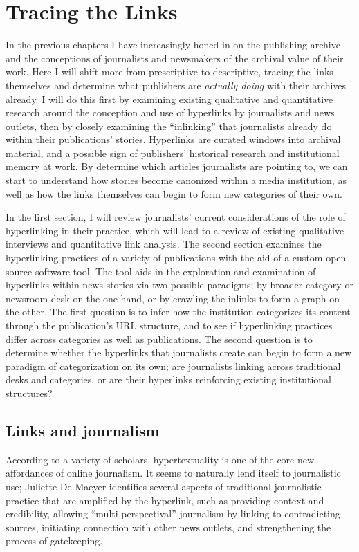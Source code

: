 \chapter{Tracing the Links}

In the previous chapters I have increasingly honed in on the publishing archive and the conceptions of journalists and newsmakers of the archival value of their work. Here I will shift more from prescriptive to descriptive, tracing the links themselves and determine what publishers are \emph{actually doing} with their archives already. I will do this first by examining existing qualitative and quantitative research around the conception and use of hyperlinks by journalists and news outlets, then by closely examining the ``inlinking'' that journalists already do within their publications' stories. Hyperlinks are curated windows into archival material, and a possible sign of publishers' historical research and institutional memory at work. By determine which articles journalists are pointing to, we can start to understand how stories become canonized within a media institution, as well as how the links themselves can begin to form new categories of their own.

In the first section, I will review journalists' current considerations of the role of hyperlinking in their practice, which will lead to a review of existing qualitative interviews and quantitative link analysis. The second section examines the hyperlinking practices of a variety of publications with the aid of a custom open-source software tool. The tool aids in the exploration and examination of hyperlinks within news stories via two possible paradigms; by broader category or newsroom desk on the one hand, or by crawling the inlinks to form a graph on the other. The first question is to infer how the institution categorizes its content through the publication's URL structure, and to see if hyperlinking practices differ across categories as well as publications. The second question is to determine whether the hyperlinks that journalists create can begin to form a new paradigm of categorization on its own; are journalists linking across traditional desks and categories, or are their hyperlinks reinforcing existing institutional structures?

\section{Links and journalism}

According to a variety of scholars, hypertextuality is one of the core new affordances of online journalism.\autocite{deuze etc.} It seems to naturally lend itself to journalistic use; Juliette De Maeyer identifies several aspects of traditional journalistic practice that are amplified by the hyperlink, such as providing context and credibility, allowing ``multi-perspectival'' journalism by linking to contradicting sources, initiating connection with other news outlets, and strengthening the process of gatekeeping.


